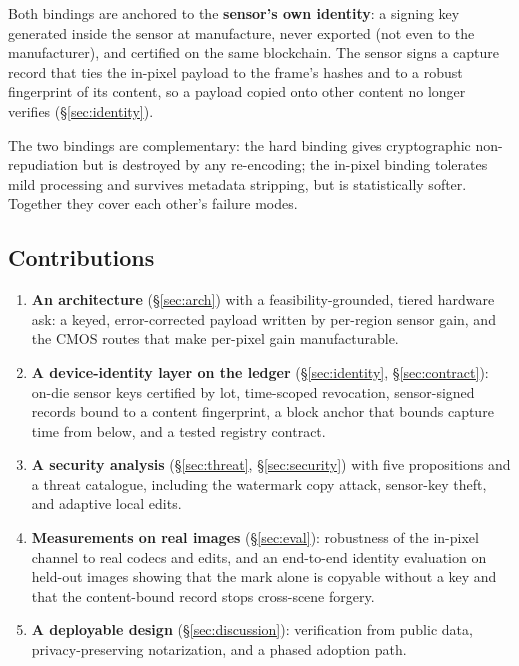 \documentclass[journal]{IEEEtran}
\begin{document}
\noindent Both bindings are anchored to the \textbf{sensor's own identity}: a
signing key generated inside the sensor at manufacture, never exported (not even
to the manufacturer), and certified on the same blockchain. The sensor signs a
capture record that ties the in-pixel payload to the frame's hashes and to a
robust fingerprint of its content, so a payload copied onto other content no
longer verifies (\S\ref{sec:identity}).

\noindent The two bindings are complementary: the hard binding gives
cryptographic non-repudiation but is destroyed by any re-encoding; the in-pixel
binding tolerates mild processing and survives metadata stripping, but is
statistically softer. Together they cover each other's failure modes.

\subsection{Contributions}
\ifshort
\begin{enumerate}
\item \textbf{An architecture} (\S\ref{sec:arch}) with a feasibility-grounded,
tiered hardware ask: a keyed, error-corrected payload written by per-region sensor
gain, and the CMOS routes that make per-pixel gain manufacturable.
\item \textbf{A device-identity layer on the ledger} (\S\ref{sec:identity},
\S\ref{sec:contract}): on-die sensor keys certified by lot, time-scoped
revocation, sensor-signed records bound to a content fingerprint, a block anchor
that bounds capture time from below, and a tested registry contract.
\item \textbf{A security analysis} (\S\ref{sec:threat}, \S\ref{sec:security}) with
five propositions and a threat catalogue, including the watermark copy attack,
sensor-key theft, and adaptive local edits.
\item \textbf{Measurements on real images} (\S\ref{sec:eval}): robustness of the
in-pixel channel to real codecs and edits, and an end-to-end identity evaluation
on held-out images showing that the mark alone is copyable without a key and that
the content-bound record stops cross-scene forgery.
\item \textbf{A deployable design} (\S\ref{sec:discussion}): verification from
public data, privacy-preserving notarization, and a phased adoption path.
\end{enumerate}
\else
\end{document}
